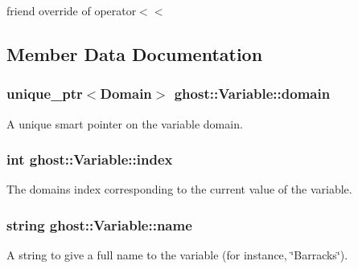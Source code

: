 friend override of operator$<$$<$ 



\subsection{Member Data Documentation}
\subsubsection[{\texorpdfstring{domain}{domain}}]{\setlength{\rightskip}{0pt plus 5cm}unique\+\_\+ptr$<${\bf Domain}$>$ ghost\+::\+Variable\+::domain\hspace{0.3cm}{\ttfamily [protected]}}\hypertarget{classghost_1_1Variable_a9dbda868fa47e4353f30461e89ff8020}{}\label{classghost_1_1Variable_a9dbda868fa47e4353f30461e89ff8020}


A unique smart pointer on the variable domain. 

\subsubsection[{\texorpdfstring{index}{index}}]{\setlength{\rightskip}{0pt plus 5cm}int ghost\+::\+Variable\+::index\hspace{0.3cm}{\ttfamily [protected]}}\hypertarget{classghost_1_1Variable_a934efa463fb1897b4266040e321dbc41}{}\label{classghost_1_1Variable_a934efa463fb1897b4266040e321dbc41}


The domain\textquotesingle{}s index corresponding to the current value of the variable. 

\subsubsection[{\texorpdfstring{name}{name}}]{\setlength{\rightskip}{0pt plus 5cm}string ghost\+::\+Variable\+::name\hspace{0.3cm}{\ttfamily [protected]}}\hypertarget{classghost_1_1Variable_a05cf4a4cd3a5c033028e0b0f11d1dafd}{}\label{classghost_1_1Variable_a05cf4a4cd3a5c033028e0b0f11d1dafd}


A string to give a full name to the variable (for instance, \char`\"{}\+Barracks\char`\"{}). 

